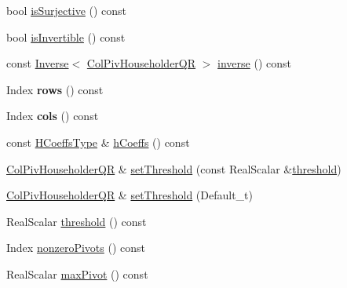 \begin{DoxyCompactItemize}
\item 
bool \mbox{\hyperlink{class_eigen_1_1_col_piv_householder_q_r_a87a7d06e0b0479e5b56b19c2a4f56365}{is\+Surjective}} () const
\item 
bool \mbox{\hyperlink{class_eigen_1_1_col_piv_householder_q_r_a945720f8d683f8ebe97fa807edd3142a}{is\+Invertible}} () const
\item 
const \mbox{\hyperlink{class_eigen_1_1_inverse}{Inverse}}$<$ \mbox{\hyperlink{class_eigen_1_1_col_piv_householder_q_r}{Col\+Piv\+Householder\+QR}} $>$ \mbox{\hyperlink{class_eigen_1_1_col_piv_householder_q_r_a31c45402e74774d9cd13af0e57a6b72f}{inverse}} () const
\item 
\mbox{\label{class_eigen_1_1_col_piv_householder_q_r_a7b149d8acc35378384bd8cd1b7335545}} 
Index {\bfseries rows} () const
\item 
\mbox{\label{class_eigen_1_1_col_piv_householder_q_r_a5d8f3537c8589e6dcdec278081d50f3c}} 
Index {\bfseries cols} () const
\item 
const \mbox{\hyperlink{struct_eigen_1_1internal_1_1true__type}{H\+Coeffs\+Type}} \& \mbox{\hyperlink{class_eigen_1_1_col_piv_householder_q_r_ac5943d19aa5fd96340c7df6874fcb1b9}{h\+Coeffs}} () const
\item 
\mbox{\hyperlink{class_eigen_1_1_col_piv_householder_q_r}{Col\+Piv\+Householder\+QR}} \& \mbox{\hyperlink{class_eigen_1_1_col_piv_householder_q_r_ae712cdc9f0e521cfc8061bee58ff55ee}{set\+Threshold}} (const Real\+Scalar \&\mbox{\hyperlink{class_eigen_1_1_col_piv_householder_q_r_a72276adb1aa11f870f50d0bd58af014d}{threshold}})
\item 
\mbox{\hyperlink{class_eigen_1_1_col_piv_householder_q_r}{Col\+Piv\+Householder\+QR}} \& \mbox{\hyperlink{class_eigen_1_1_col_piv_householder_q_r_a648df14c457ceceb09d933d06d3bdded}{set\+Threshold}} (Default\+\_\+t)
\item 
Real\+Scalar \mbox{\hyperlink{class_eigen_1_1_col_piv_householder_q_r_a72276adb1aa11f870f50d0bd58af014d}{threshold}} () const
\item 
Index \mbox{\hyperlink{class_eigen_1_1_col_piv_householder_q_r_a796610bab81f0527aa1ae440c71f58a4}{nonzero\+Pivots}} () const
\item 
Real\+Scalar \mbox{\hyperlink{class_eigen_1_1_col_piv_householder_q_r_aac8c43d720170980f582d01494df9e8f}{max\+Pivot}} () const
\item 

\end{DoxyCompactItemize}
